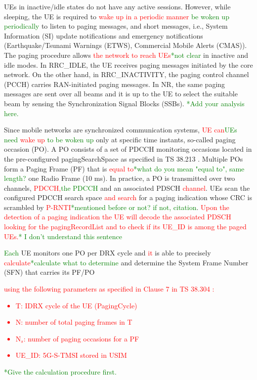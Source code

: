 \documentclass[]{IEEEtran}
\newcommand{\CAREPL}[2]{\textcolor{red}{#1}\textcolor{green}{#2}}
\begin{document}
UEs in inactive/idle states do not have any active sessions. However, while sleeping, the UE is required to \CAREPL{ wake up in a periodic manner}{ be woken up periodically} to listen to paging messages, and short messages, i.e., System Information (SI) update notifications and emergency notifications (Earthquake/Tsunami Warnings (ETWS), Commercial Mobile Alerts (CMAS)). 
The paging procedure allows \CAREPL{the network to reach UEs}{*not clear} in inactive and idle modes. 
In RRC\_IDLE, the UE receives paging messages initiated by the core network. On the other hand, in RRC\_INACTIVITY, the paging control channel (PCCH) carries RAN-initiated paging messages. In NR, the same paging messages are sent over all beams and it is up to the UE to select the suitable beam by sensing the Synchronization Signal Blocks (SSBs).
\CAREPL{}{*Add your analysis here.}



Since mobile networks are synchronized communication systems, \CAREPL{UE can}{UEs need} \CAREPL{wake up}{ to be woken up} only at specific time instants, so-called paging occasion (PO). 
A PO consists of a set of PDCCH monitoring occasions located in the pre-configured pagingSearchSpace as specified in TS 38.213 \cite{3gpp_nr_2022-1_38.213}. 
Multiple POs form a Paging Frame (PF) that is \CAREPL{equal to}{*what do you mean "equal to", same length?} one Radio Frame (10 ms). 
In practice, a PO is transmitted over two channels, \CAREPL{PDCCH,}{the PDCCH} and an associated PDSCH \cite{esswie_power_2022} \CAREPL{channel}{}. 
UEs scan the configured PDCCH search space \CAREPL{and search}{} for a paging indication whose CRC is scrambled by \CAREPL{P-RNTI}{*mentioned before or not? if not, citation}. 
\CAREPL{Upon the detection of a paging indication the UE will decode the associated PDSCH looking for the pagingRecordList and to check if its UE\_ID is among the paged UEs.}{* I don't understand this sentence}

\CAREPL{}{Each} UE monitors one PO per DRX cycle and \CAREPL{it}{} is able to precisely \CAREPL{calculate}{*calculate what to determine} and determine the System Frame Number (SFN) that carries its PF/PO \CAREPL{using the following parameters as specified in Clause 7 in TS 38.304 \cite{3gpp_nr_2022-10_38.304}:
 \begin{itemize}
     \item T: IDRX cycle of the UE (PagingCycle)
     \item N: number of total paging frames in T
     \item N$_{s}$: number of paging occasions for a PF
     \item UE\_ID: 5G-S-TMSI stored in USIM
 \end{itemize}
}{*Give the calculation procedure first.}
\end{document}
